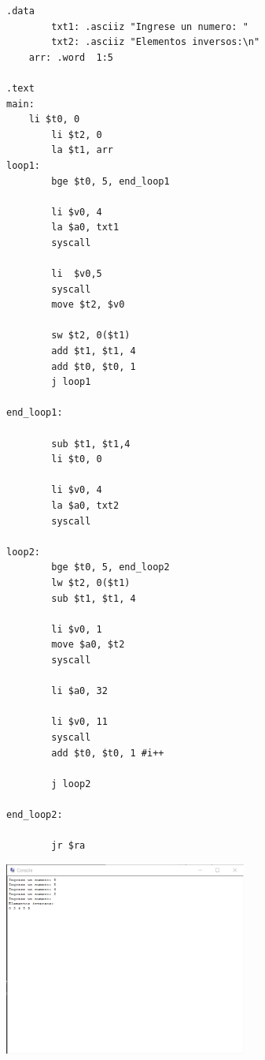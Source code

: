 \documentclass{article}
\begin{document}
\begin{enumerate}
		\begin{lstlisting}[language={[x86masm]Assembler}, basicstyle=\small]
.data 
    	txt1: .asciiz "Ingrese un numero: "
    	txt2: .asciiz "Elementos inversos:\n"
	arr: .word	1:5 
    
.text 
main: 
	li $t0, 0
    	li $t2, 0
    	la $t1, arr
loop1:
    	bge $t0, 5, end_loop1
    
    	li $v0, 4
    	la $a0, txt1
    	syscall
    
    	li  $v0,5 
    	syscall
    	move $t2, $v0
    
    	sw $t2, 0($t1) 
    	add $t1, $t1, 4 
    	add $t0, $t0, 1 
    	j loop1

end_loop1:

    	sub $t1, $t1,4
    	li $t0, 0
    	
    	li $v0, 4
    	la $a0, txt2
    	syscall

loop2:
    	bge $t0, 5, end_loop2
    	lw $t2, 0($t1)
    	sub $t1, $t1, 4

    	li $v0, 1      
    	move $a0, $t2
    	syscall

    	li $a0, 32

    	li $v0, 11
    	syscall
    	add $t0, $t0, 1	#i++

    	j loop2

end_loop2:

    	jr $ra
		   \end{lstlisting}	
	
	\includegraphics[width=8cm]{img/eje2.png}
	
	\clearpage
		\end{enumerate}
	
\end{document}
